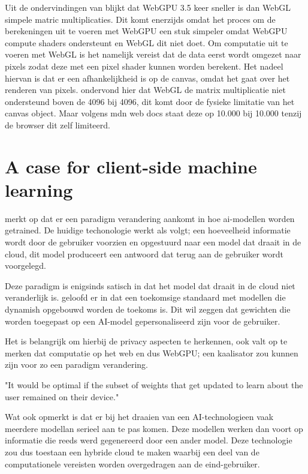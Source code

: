 Uit de ondervindingen van \textcite{Radin2021} blijkt dat WebGPU 3.5 keer sneller is dan WebGL simpele matric multiplicaties. Dit komt enerzijds omdat het proces om de berekeningen uit te voeren met WebGPU een stuk simpeler omdat WebGPU compute shaders ondersteunt en WebGL dit niet doet. Om computatie uit te voeren met WebGL is het namelijk vereist dat de data eerst wordt omgezet naar pixels zodat deze met een pixel shader kunnen worden berekent. Het nadeel hiervan is dat er een afhankelijkheid is op de canvas, omdat het gaat over het renderen van pixels. \textcite{Radin2021} ondervond hier dat WebGL de matrix multiplicatie niet ondersteund boven de 4096 bij 4096, dit komt door de fysieke limitatie van het canvas object. Maar volgens mdn web docs staat deze op 10.000 bij 10.000 tenzij de browser dit zelf limiteerd.


\section{A case for client-side machine learning} %

\textcite{Fleetwood2022} merkt op dat er een paradigm verandering aankomt in hoe ai-modellen worden getrained. De huidige techonologie werkt als volgt; een hoeveelheid informatie wordt door de gebruiker voorzien en opgestuurd naar een model dat draait in de cloud, dit model produceert een antwoord dat terug aan de gebruiker wordt voorgelegd.

\bigbreak{}

Deze paradigm is enigsinds satisch in dat het model dat draait in de cloud niet veranderlijk is. \textcite{Fleetwood2022} geloofd er in dat een toekomsige standaard met modellen die dynamish opgebouwd worden de toekoms is. Dit wil zeggen dat gewichten die worden toegepast op een AI-model gepersonaliseerd zijn voor de gebruiker.

\bigbreak{}

Het is belangrijk om hierbij de privacy aspecten te herkennen, ook valt op te merken dat computatie op het web en dus WebGPU; een kaalisator zou kunnen zijn voor zo een paradigm verandering.

\begin{displayquote}
    "It would be optimal if the subset of weights that get updated to learn about the user remained on their device." \autocite{Fleetwood2022}
\end{displayquote}

Wat \textcite{Fleetwood2022} ook opmerkt is dat er bij het draaien van een AI-technologieen vaak meerdere modellan serieel aan te pas komen. Deze modellen werken dan voort op informatie die reeds werd gegenereerd door een ander model. Deze technologie zou dus toestaan een hybride cloud te maken waarbij een deel van de computationele vereisten worden overgedragen aan de eind-gebruiker.

